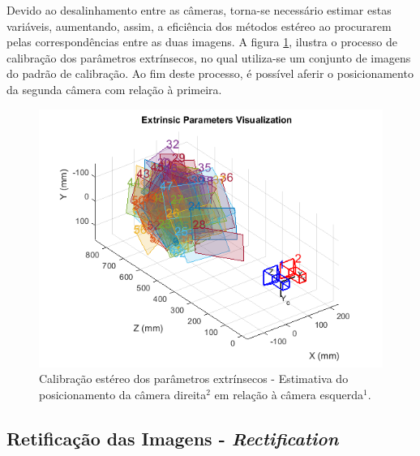 Devido ao desalinhamento entre as câmeras, torna-se necessário estimar estas variáveis, aumentando, assim, a eficiência dos métodos estéreo ao procurarem pelas correspondências entre as duas imagens. A figura \ref{stereo_calib_extrinsic}, ilustra o processo de calibração dos parâmetros extrínsecos, no qual utiliza-se um conjunto de imagens do padrão de calibração. Ao fim deste processo, é possível aferir o posicionamento da segunda câmera com relação à primeira\cite{Bouguet1999}.

\begin{figure}[H]
 	\centering
 	\includegraphics[scale=0.70]{./Resources/stereo_calib_extrinsic.png}
 	\caption{Calibração estéreo dos parâmetros extrínsecos - Estimativa do posicionamento da câmera direita$^2$ em relação à câmera esquerda$^1$.}
 	\label{stereo_calib_extrinsic}
\end{figure}

\subsection{Retificação das Imagens  - \textit{Rectification}}

